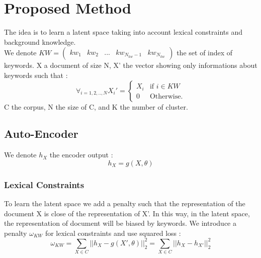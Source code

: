 \section{Proposed Method}
The idea is to learn a latent space taking into account lexical constraints and
background knowledge.
\\We denote $KW = \begin{pmatrix} kw_1 & kw_2 & ... & kw_{N_{kw}-1} & kw_{N_{kw}}
\end {pmatrix}$
the set of index of keywords. X a document of size N,
X' the vector showing only informations about keywords such that :
\begin{equation*}
\forall_{i=1,2,..,N}X_i' = \left\{
\begin{array}{ll}
  X_i & \mbox{if } i \in KW \\
  0 & \mbox{Otherwise.}
\end{array}
\right.
\end{equation*}
C the corpus, N the size of C, and K the number of cluster.
\subsection{Auto-Encoder}
We denote $h_X$ the encoder output : 
\begin{equation}\label{eq:h}
  h_X = g(X,\theta)
\end{equation}
\subsubsection{Lexical Constraints}
To learn the latent space we add a penalty such that the representation
of the document X is close of the representation of X'. In this way, in the
latent space, the representation of document will be biased by keywords.
We introduce a penalty $\omega_{KW}$ for lexical constraints and
use squared loss : 
\begin{equation}\label{eq:omega1}
  \omega_{KW} = \sum_{X \in C} || h_{X} - g(X',\theta) ||_2^2 =
  \sum_{X \in C} || h_{X} - h_{X'}||_2^2
\end{equation}
